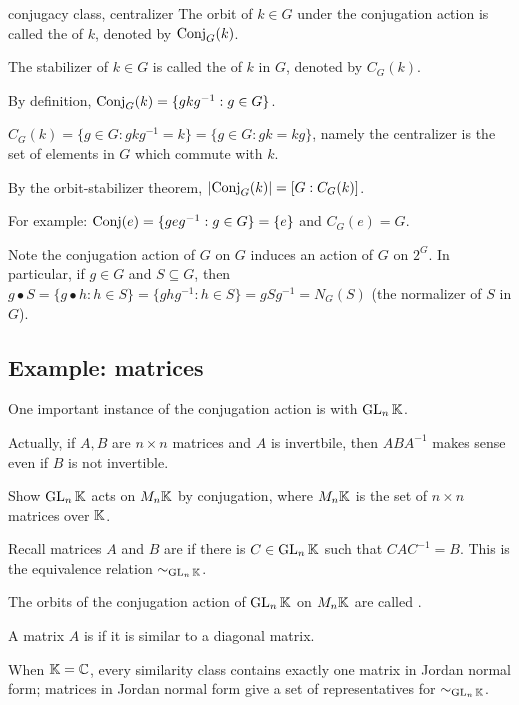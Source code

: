 \documentclass[12pt,letterpaper]{report}
\begin{document}
\begin{defn}{conjugacy class, centralizer}{}
  The orbit of $k \in G$ under the conjugation action is called the  of $k$,
  denoted by $\operatorname{Conj}_G(k)$.

  The stabilizer of $k \in G$ is called the  of $k$ in $G$, denoted by $C_G(k)$.
\end{defn}

By definition, $\operatorname{Conj}_G(k) = \{gkg^{-1} : g \in G\}$.

$C_G(k) = \{g \in G : gkg^{-1} = k\} = \{g \in G : gk = kg\}$, namely the centralizer is the set
of elements in $G$ which commute with $k$.

By the orbit-stabilizer theorem, $\lvert\operatorname{Conj}_G(k)\rvert = [G : C_G(k)]$.

For example: $\operatorname{Conj}(e) = \{geg^{-1} : g \in G\} = \{e\}$ and $C_G(e) = G$.

Note the conjugation action of $G$ on $G$ induces an action of $G$ on $2^G$.
In particular, if $g \in G$ and $S \subseteq G$, then
$g \bullet S = \{g \bullet h : h \in S\} = \{ghg^{-1} : h \in S\} = gSg^{-1} = N_G(S)$ (the
normalizer of $S$ in $G$).

\pagebreak
\subsection{Example: matrices}

One important instance of the conjugation action is with $\operatorname{GL}_n\mathbb{K}$.

Actually, if $A, B$ are $n \times n$ matrices and $A$ is invertbile, then $ABA^{-1}$ makes sense
even if $B$ is not invertible.

\begin{exer}{}{}
  Show $\operatorname{GL}_n\mathbb{K}$ acts on $M_n\mathbb{K}$ by conjugation, where $M_n\mathbb{K}$ is the set
  of $n \times n$ matrices over $\mathbb{K}$.
\end{exer}

Recall matrices $A$ and $B$ are  if there is $C \in \operatorname{GL}_n\mathbb{K}$ such that
$CAC^{-1} = B$.
This is the equivalence relation $\sim_{\operatorname{GL}_n\mathbb{K}}$.

The orbits of the conjugation action of $\operatorname{GL}_n\mathbb{K}$ on $M_n\mathbb{K}$ are called
.

A matrix $A$ is  if it is similar to a diagonal matrix.

When $\mathbb{K} = \mathbb{C}$, every similarity class contains exactly one matrix in Jordan
normal form; matrices in Jordan normal form give a set of representatives for
$\sim_{\operatorname{GL}_n\mathbb{K}}$.
\end{document}
